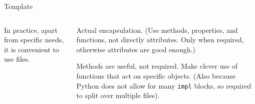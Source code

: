 \documentclass[9pt]{beamer}
\begin{document}
\begin{frame}{Template}
\begin{columns}
\begin{column}{0.5\textwidth}
            \begin{flushright}
                \footnotesize
                In practice, apart from specific needs, it is convenient to use
                files.
            \end{flushright}
        \end{column}
        \begin{column}{0.5\textwidth}
            Actual encapsulation.
            (Use methods, properties, and functions, not directly attributes.
            Only when required, otherwise attributes are good enough.)

            Methods are useful, not required. Make clever use of functions that
            act on specific objects.
            (Also because Python does not allow for many \texttt{impl} blocks,
            so required to split over multiple files).
        \end{column}
    \end{columns}
\end{frame}
\end{document}

